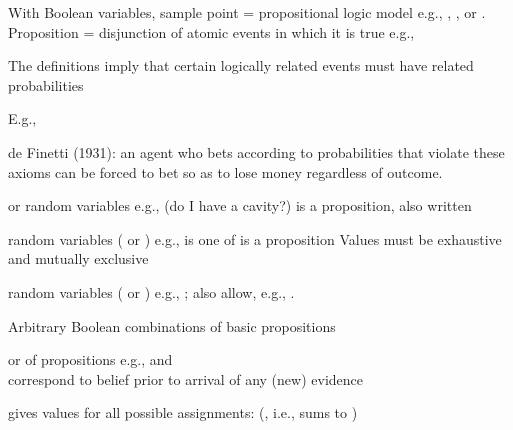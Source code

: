\documentclass{article}
\begin{document}
\begin{huge}
With Boolean variables, sample point = propositional logic model\nl
  e.g., , , or .\\
Proposition = disjunction of atomic events in which it is true\al
e.g., \al
{}



The definitions imply that certain logically related events
must have related probabilities

E.g., 

\vspace*{0.2in}

\textwidth
{}

de Finetti (1931): an agent who bets according to probabilities that violate
these axioms can be forced to bet so as to lose money regardless of outcome.


 or  random variables\al
  e.g.,  (do I have a cavity?)\al
   is a proposition, also written 

 random variables ( or ) \al
  e.g.,  is one of \al
   is a proposition\al
Values must be exhaustive and mutually exclusive

 random variables ( or )\al
  e.g., ; also allow, e.g., .

Arbitrary Boolean combinations of basic propositions


 or  of propositions\al
  e.g.,  and \\
correspond to belief prior to arrival of any (new) evidence

 gives values for all possible assignments:\al
   (, i.e., 
       sums to )


\end{huge}
\end{document}
